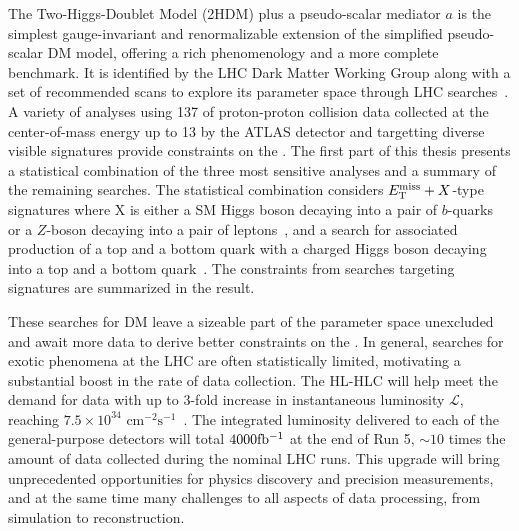 The Two-Higgs-Doublet Model (2HDM) \cite{Bauer:2017ota} plus a pseudo-scalar mediator $a$ is the simplest gauge-invariant and renormalizable extension of the simplified pseudo-scalar DM model, offering a rich phenomenology and a more complete benchmark.
It is identified by the LHC Dark Matter Working Group along with a set of recommended scans to explore its parameter space through LHC searches~\cite{2HDMWGproxi}. 
A variety of analyses using 137 \ifb of proton-proton collision data collected at the center-of-mass energy up to 13 \TeV by the ATLAS detector and targetting diverse visible signatures provide constraints on the \thdma. 
The first part of this thesis presents a statistical combination of the three most sensitive analyses and a summary of the remaining searches.
The statistical combination considers $E_{\mathrm{T}}^{\mathrm{miss}}+X$-type signatures where X is either a SM Higgs boson decaying into a pair of $b$-quarks~\cite{EXOT-2018-46} or a $Z$-boson decaying into a pair of leptons~\cite{HIGG-2018-26}, and a search for associated production of a top and a bottom quark with a charged Higgs boson decaying into a top and a bottom quark~\cite{HDBS-2018-51}.
The constraints from searches targeting signatures are summarized in the result. 

These searches for DM leave a sizeable part of the parameter space unexcluded and await more data to derive better constraints on the \thdma. 
In general, searches for exotic phenomena at the LHC are often statistically limited, motivating a substantial boost in the rate of data collection. 
The HL-HLC will help meet the demand for data with up to 3-fold increase in instantaneous luminosity $\mathcal{L}$, reaching $7.5\times 10^{34}$ $\mathrm{cm}^{-2}\mathrm{s^{-1}}$~\cite{Aberle:2749422}.
The integrated luminosity delivered to each of the general-purpose detectors will total $4000\mbox{fb\(^{-1}\)}$ at the end of Run 5, $\sim 10$ times the amount of data collected during the nominal LHC runs. 
This upgrade will bring unprecedented opportunities for physics discovery and precision measurements, and at the same time many challenges to all aspects of data processing, from simulation to reconstruction. 

